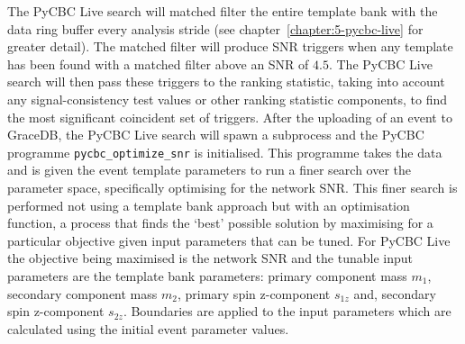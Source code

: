The PyCBC Live search will matched filter the entire template bank with the data ring buffer every analysis stride (see chapter~\ref{chapter:5-pycbc-live} for greater detail). The matched filter will produce SNR triggers when any template has been found with a matched filter above an SNR of $4.5$. The PyCBC Live search will then pass these triggers to the ranking statistic, taking into account any signal-consistency test values or other ranking statistic components, to find the most significant coincident set of triggers. After the uploading of an event to GraceDB, the PyCBC Live search will spawn a subprocess and the PyCBC programme \texttt{pycbc\_optimize\_snr} is initialised. This programme takes the \gwadj data and is given the event template parameters to run a finer search over the parameter space, specifically optimising for the network SNR. This finer search is performed not using a template bank approach but with an optimisation function, a process that finds the `best' possible solution by maximising for a particular objective given input parameters that can be tuned. For PyCBC Live the objective being maximised is the network SNR and the tunable input parameters are the template bank parameters: primary component mass $m_{1}$, secondary component mass $m_{2}$, primary spin z-component $s_{1z}$ and, secondary spin z-component $s_{2z}$. Boundaries are applied to the input parameters which are calculated using the initial event parameter values.

